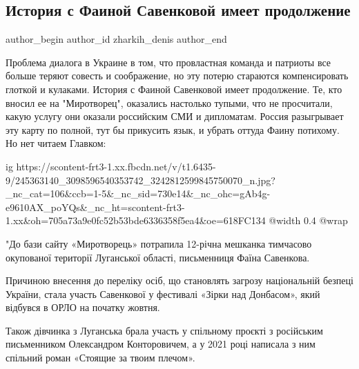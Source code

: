  
 
 
 
 
 
\subsection{История с Фаиной Савенковой имеет продолжение}
\label{sec:13_10_2021.fb.zharkih_denis.4.savenkova_prodolzhenie}
 
\ifcmt
 author_begin
   author_id zharkih_denis
 author_end
\fi

Проблема диалога в Украине в том, что провластная команда и патриоты все больше
теряют совесть и соображение, но эту потерю стараются компенсировать глоткой и
кулаками. История с Фаиной Савенковой имеет продолжение. Те, кто вносил ее на
"Миротворец", оказались настолько тупыми, что не просчитали, какую услугу они
оказали российским СМИ и дипломатам. Россия разыгрывает эту карту по полной,
тут бы прикусить язык, и убрать оттуда Фаину потихому. Но нет читаем Главком: 

\ifcmt
  ig https://scontent-frt3-1.xx.fbcdn.net/v/t1.6435-9/245363140_3098596540353742_3242812599845750070_n.jpg?_nc_cat=106&ccb=1-5&_nc_sid=730e14&_nc_ohc=gAb4g-e9610AX_poYQs&_nc_ht=scontent-frt3-1.xx&oh=705a73a9e0fc52b53bde6336358f5ea4&oe=618FC134
  @width 0.4
  @wrap 
\fi

"До бази сайту «Миротворець» потрапила 12-річна мешканка тимчасово окупованої
території Луганської області, письменниця Фаїна Савенкова.

Причиною внесення до переліку осіб, що становлять загрозу національній безпеці
України, стала участь Савенкової у фестивалі «Зірки над Донбасом», який
відбувся в ОРЛО на початку жовтня.

Також дівчинка з Луганська брала участь у спільному проєкті з російським
письменником Олександром Конторовичем, а у 2021 році написала з ним спільний
роман «Стоящие за твоим плечом».

